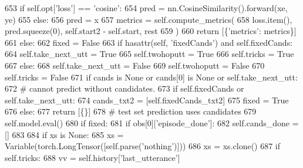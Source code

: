 \begin{DoxyCode}
653                 \textcolor{keywordflow}{if} self.opt[\textcolor{stringliteral}{'loss'}] == \textcolor{stringliteral}{'cosine'}:
654                     pred = nn.CosineSimilarity().forward(xe, ye)
655                 \textcolor{keywordflow}{else}:
656                     pred = x
657                 metrics = self.compute\_metrics(
658                     loss.item(), pred.squeeze(0), self.start2 - self.start, rest
659                 )
660                 \textcolor{keywordflow}{return} [\{\textcolor{stringliteral}{'metrics'}: metrics\}]
661         \textcolor{keywordflow}{else}:
662             fixed = \textcolor{keyword}{False}
663             \textcolor{keywordflow}{if} hasattr(self, \textcolor{stringliteral}{'fixedCands'}) \textcolor{keywordflow}{and} self.fixedCands:
664                 self.take\_next\_utt = \textcolor{keyword}{True}
665                 self.twohoputt = \textcolor{keyword}{True}
666                 self.tricks = \textcolor{keyword}{True}
667             \textcolor{keywordflow}{else}:
668                 self.take\_next\_utt = \textcolor{keyword}{False}
669                 self.twohoputt = \textcolor{keyword}{False}
670                 self.tricks = \textcolor{keyword}{False}
671             \textcolor{keywordflow}{if} cands \textcolor{keywordflow}{is} \textcolor{keywordtype}{None} \textcolor{keywordflow}{or} cands[0] \textcolor{keywordflow}{is} \textcolor{keywordtype}{None} \textcolor{keywordflow}{or} self.take\_next\_utt:
672                 \textcolor{comment}{# cannot predict without candidates.}
673                 \textcolor{keywordflow}{if} self.fixedCands \textcolor{keywordflow}{or} self.take\_next\_utt:
674                     cands\_txt2 = [self.fixedCands\_txt2]
675                     fixed = \textcolor{keyword}{True}
676                 \textcolor{keywordflow}{else}:
677                     \textcolor{keywordflow}{return} [\{\}]
678             \textcolor{comment}{# test set prediction uses candidates}
679             self.model.eval()
680             \textcolor{keywordflow}{if} fixed:
681                 \textcolor{keywordflow}{if} obs[0][\textcolor{stringliteral}{'episode\_done'}]:
682                     self.cands\_done = []
683 
684                 \textcolor{keywordflow}{if} xs \textcolor{keywordflow}{is} \textcolor{keywordtype}{None}:
685                     xs = Variable(torch.LongTensor([self.parse(\textcolor{stringliteral}{'nothing'})]))
686                 xs = xs.clone()
687                 \textcolor{keywordflow}{if} self.tricks:
688                     vv = self.history[\textcolor{stringliteral}{'last\_utterance'}]

\end{DoxyCode}
